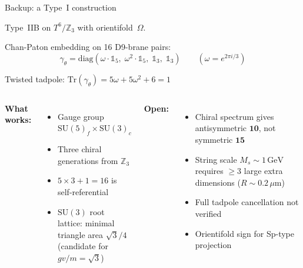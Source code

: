 \documentclass[aspectratio=169,12pt]{beamer}
\newcommand{\GeV}{\,\text{GeV}}
\begin{document}
\begin{frame}{Backup: a Type~I construction}

Type~IIB on $T^6/\mathbb{Z}_3$ with orientifold~$\Omega$.

\medskip
Chan-Paton embedding on 16 D9-brane pairs:
\begin{equation*}
\gamma_\theta = \mathrm{diag}(\omega\cdot\mathbb{1}_5,\;
  \omega^2\cdot\mathbb{1}_5,\; \mathbb{1}_3,\; \mathbb{1}_3)
\qquad (\omega = e^{2\pi i/3})
\end{equation*}

Twisted tadpole: $\mathrm{Tr}(\gamma_\theta)
= 5\omega + 5\omega^2 + 6 = 1$ \quad\checkmark

\bigskip
\begin{columns}[T]
\textbf{What works:}
\begin{itemize}
\item Gauge group $\mathrm{SU}(5)_f \times \mathrm{SU}(3)_c$
\item Three chiral generations from $\mathbb{Z}_3$
\item $5\times 3 + 1 = 16$ is self-referential
\item $\mathrm{SU}(3)$ root lattice: minimal triangle
  area $\sqrt{3}/4$ \\ (candidate for $gv/m = \sqrt{3}$)
\end{itemize}

\textbf{Open:}
\begin{itemize}
\item Chiral spectrum gives antisymmetric $\mathbf{10}$,
  not symmetric $\mathbf{15}$
\item String scale $M_s \sim 1\GeV$ requires
  $\geq 3$ large extra dimensions ($R \sim 0.2\,\mu$m)
\item Full tadpole cancellation not verified
\item Orientifold sign for Sp-type projection
\end{itemize}
\end{columns}

\end{frame}
\end{document}
